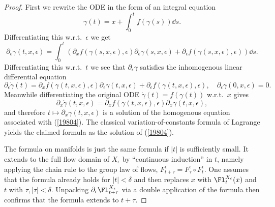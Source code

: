 \begin{proof}
    First we rewrite the ODE in the form of an integral equation
    \[\gamma(t)=x+\int_0^t f(\gamma(s))\dd s.\]
    Differentiating this w.r.t.\ $\epsilon$ we get
    \[\partial_\epsilon\gamma(t,x,\epsilon)=\int_0^t \left(\partial_x f(\gamma(s,x,\epsilon),\epsilon)\partial_\epsilon\gamma(s,x,\epsilon)+\partial_\epsilon f(\gamma(s,x,\epsilon),\epsilon)\right)\dd s.\]
    Differentiating this w.r.t.\ $t$ we see that $\partial_\epsilon \gamma$ satisfies the inhomogenous linear differential equation
    \[\partial_\epsilon \dot\gamma(t)=\partial_xf(\gamma(t,x,\epsilon),\epsilon)\partial_\epsilon \gamma(t,x,\epsilon)+\partial_\epsilon f(\gamma(t,x,\epsilon),\epsilon),\quad \partial_\epsilon\gamma(0,x,\epsilon)=0.\label{19804}\]
    Meanwhile differentiating the original ODE $\dot\gamma(t)=f(\gamma(t))$ w.r.t.\ $x$ gives
    \[ \partial_x\dot \gamma(t,x,\epsilon)=\partial_xf(\gamma(t,x,\epsilon),\epsilon)\partial_x\gamma(t,x,\epsilon),\]
    and therefore $t\mapsto \partial_x \gamma(t,x,\epsilon)$ is a solution of the homogenous equation associated with (\ref{19804}). The classical variation-of-constants formula of Lagrange yields the claimed formula as the solution of (\ref{19804}).

    The formula on manifolds is just the same formula if $|t|$ is sufficiently small. It extends to the full flow domain of $X_\epsilon$ by ``continuous induction'' in $t$, namely applying the chain rule to the group law of flows, $F^\epsilon_{t+\tau}=F^\epsilon_\tau\circ F^\epsilon_t$. One assumes that the formula already holds for $|t|<\delta$ and then replaces $x$ with $\Fl_t^{X_\epsilon}(x)$ and $t$ with $\tau,|\tau|<\delta$. Unpacking $\partial_\epsilon \Fl_{t+\tau}^{X_\epsilon}$ via a double application of the formula then confirms that the formula extends to $t+\tau$.
\end{proof}

